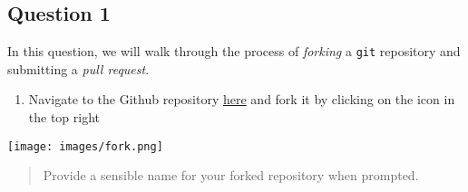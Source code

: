 \documentclass[
  letterpaper,
  DIV=11,
  numbers=noendperiod]{scrartcl}
\providecommand{\tightlist}{%
  \setlength{\itemsep}{0pt}\setlength{\parskip}{0pt}}\usepackage{longtable,booktabs,array}
\begin{document}
\hypertarget{section}{%
\subsection{\texorpdfstring{}{    }}\label{section}}

\hypertarget{question-1}{%
\subsection{Question 1}\label{question-1}}

\begin{tcolorbox}[enhanced jigsaw, colback=white, bottomrule=.15mm, coltitle=black, rightrule=.15mm, toprule=.15mm, opacityback=0, title=\textcolor{quarto-callout-tip-color}{\faLightbulb}\hspace{0.5em}{20 points}, breakable, colbacktitle=quarto-callout-tip-color!10!white, opacitybacktitle=0.6, bottomtitle=1mm, colframe=quarto-callout-tip-color-frame, toptitle=1mm, leftrule=.75mm, arc=.35mm, titlerule=0mm, left=2mm]

\end{tcolorbox}

In this question, we will walk through the process of \emph{forking} a
\texttt{git} repository and submitting a \emph{pull request}.

\begin{enumerate}
\def\labelenumi{\arabic{enumi}.}
\tightlist
\item
  Navigate to the Github repository
  \href{https://github.com/STAT380/hw1.git}{here} and fork it by
  clicking on the icon in the top right
\end{enumerate}

\texttt{[image: images/fork.png]}

\begin{quote}
Provide a sensible name for your forked repository when prompted.
\end{quote}
\end{document}
